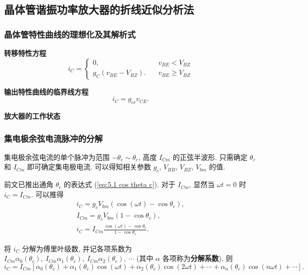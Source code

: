 \subsection{晶体管谐振功率放大器的折线近似分析法} \label{5 晶体管谐振功率放大器的折线近似分析法}
\subsubsection{晶体管特性曲线的理想化及其解析式}
\textbf{转移特性方程}
\begin{equation} \label{eq:5.2 transfer}
    i_C=\begin{cases}
        0,                  & \quad v_{BE}<V_{BZ}     \\
        g_C(v_{BE}-V_{BZ}). & \quad v_{BE}\geq V_{BZ}
    \end{cases}
\end{equation}

\textbf{输出特性曲线的临界线方程}
\begin{equation} \label{eq:5.2 output limit}
    i_C=g_{cr}v_{CE}.
\end{equation}

\textbf{放大器的工作状态}

\subsubsection{集电极余弦电流脉冲的分解}
集电极余弦电流的单个脉冲为范围 $-\theta_c\sim\theta_c$, 高度 $I_{Cm}$ 的正弦半波形. 只需确定 $\theta_c$ 和 $I_{Cm}$ 即可确定集电极电流. 可以得知相关参数 $g_c$, $V_{BB}$, $V_{BZ}$, $V_{bm}$ 的值.

前文已推出通角 $\theta_c$ 的表达式 (\ref{eq:5.1 cos theta c}). 对于 $I_{Cm}$, 显然当 $\omega t=0$ 时 $i_C=I_{Cm}$. 可以推得
\begin{gather}
    i_C=g_cV_{bm}(\cos(\omega t)-\cos\theta_c), \\
    I_{Cm}=g_cV_{bm}(1-\cos\theta_c), \label{eq:5.2 I Cm} \\
    i_C=I_{Cm}\frac{\cos(\omega t)-\cos\theta_c}{1-\cos\theta_c}. \label{eq:5.2 i C}
\end{gather}

将 $i_C$ 分解为傅里叶级数, 并记各项系数为 $I_{Cm}\alpha_0(\theta_c),\ I_{Cm}\alpha_1(\theta_c),\ I_{Cm}\alpha_2(\theta_c),\ \cdots$ (其中 $\alpha$ 各项称为\textbf{分解系数}). 则
\begin{equation} \label{eq:5.2 i C fourier}
    i_C=I_{Cm}[\alpha_0(\theta_c)+\alpha_1(\theta_c)\cos(\omega t)+\alpha_2(\theta_c)\cos(2\omega t)+\cdots+\alpha_n(\theta_c)\cos(n\omega t)+\cdots].
\end{equation}

